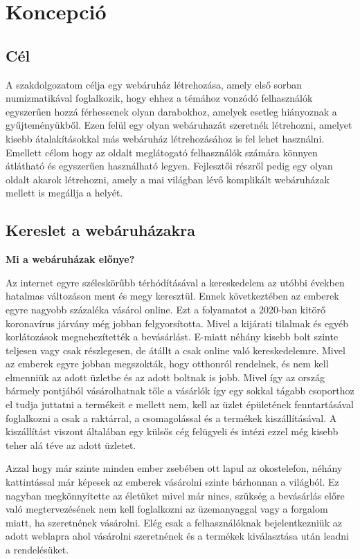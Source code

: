 \chapter{Koncepció}

\section{Cél}
A szakdolgozatom célja egy webáruház létrehozása, amely első sorban numizmatikával foglalkozik, hogy ehhez a témához vonzódó felhasználók egyszerűen hozzá férhessenek olyan darabokhoz, amelyek esetleg hiányoznak a gyűjteményükből. Ezen felül egy olyan webáruhazát szeretnék létrehozni, amelyet kisebb átalakításokkal más webáruház létrehozásához is fel lehet használni. Emellett célom hogy az oldalt meglátogató felhasználók számára könnyen átlátható és egyszerűen használható legyen. Fejlesztői részről pedig egy olyan oldalt akarok létrehozni, amely a mai világban lévő komplikált webáruházak mellett is megállja a helyét.

\section{Kereslet a webáruházakra}
\large\textbf{Mi a webáruházak előnye?}

Az internet egyre széleskörűbb térhódításával a kereskedelem az utóbbi években hatalmas változáson ment és megy keresztül. Ennek következtében az emberek egyre nagyobb százaléka vásárol online. Ezt a folyamatot a 2020-ban kitörő koronavírus járvány még jobban felgyorsította. Mivel a kijárati tilalmak és egyéb korlátozások megnehezítették a bevásárlást. E-miatt néhány kisebb bolt szinte teljesen vagy csak részlegesen, de átállt a csak online való kereskedelemre.  Mivel az emberek egyre jobban megszokták, hogy otthonról rendelnek, és nem kell elmenniük az adott üzletbe és az adott boltnak is jobb. Mivel így az ország bármely pontjából vásárolhatnak tőle a vásárlók így egy sokkal tágabb csoporthoz el tudja juttatni a termékeit e mellett nem, kell az üzlet épületének fenntartásával foglalkozni a csak a raktárral, a csomagolással és a termékek kiszállításával. A kiszállítást viszont általában egy külsős cég felügyeli és intézi ezzel még kisebb teher alá téve az adott üzletet.

Azzal hogy már szinte minden ember zsebében  ott lapul az okostelefon, néhány kattintással már képesek az emberek vásárolni szinte bárhonnan a világból. Ez nagyban megkönnyítette az életüket mivel már nincs, szükség a bevásárlás előre való megtervezésének nem kell foglalkozni az üzemanyaggal vagy a forgalom miatt, ha szeretnének vásárolni. Elég csak a felhasználóknak bejelentkezniük az adott weblapra ahol vásárolni szeretnének és a termékek kiválasztása után leadni a rendelésüket.

